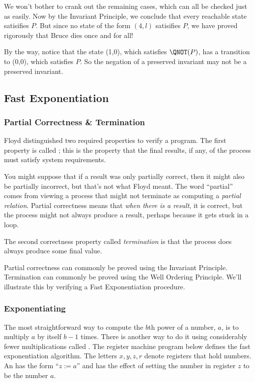 We won't bother to crank out the remaining cases, which can all be checked
just as easily.  Now by the Invariant Principle, we conclude that every
reachable state satisifies $P$.  But since no state of the form $(4,l)$
satisifies $P$, we have proved rigorously that Bruce dies once and for
all!

By the way, notice that the state (1,0), which satisfies $\QNOT(P)$, has a
transition to (0,0), which satisfies $P$.  So the negation of a preserved
invariant may not be a preserved invariant.

\subsection{Fast Exponentiation}\label{fast_exp_subsec}

\subsubsection{Partial Correctness \& Termination}

Floyd distinguished two required properties to verify a program.  The
first property is called ; this is the property
that the final results, if any, of the process must satisfy system
requirements.

You might suppose that if a result was only partially correct, then it
might also be partially incorrect, but that's not what Floyd meant.  The
word ``partial'' comes from viewing a process that might not terminate as
computing a \emph{partial relation}.  Partial correctness means that
\emph{when there is a result}, it is correct, but the process might not
always produce a result, perhaps because it gets stuck in a loop.

The second correctness property called \emph{termination} is that the
process does always produce some final value.

Partial correctness can commonly be proved using the Invariant Principle.
Termination can commonly be proved using the Well Ordering Principle.
We'll illustrate this by verifying a Fast Exponentiation procedure.

\subsubsection{Exponentiating}\label{fast_exp_subsubsec}
The most straightforward way to compute the $b$th power of a number, $a$,
is to multiply $a$ by itself $b-1$ times.  There is another way to do it
using considerably fewer multiplications called .  The register machine program below defines the fast
exponentiation algorithm.  The letters $x,y,z,r$ denote registers that
hold numbers. An  has the form ``$z := a$'' and
has the effect of setting the number in register $z$ to be the number $a$.

